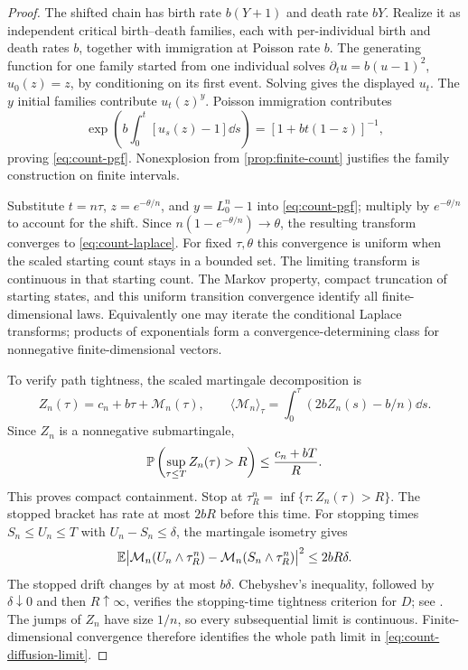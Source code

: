 \begin{proof}
The shifted chain has birth rate $b(Y+1)$ and death rate $bY$. Realize it
as independent critical birth--death families, each with per-individual
birth and death rates $b$, together with immigration at Poisson rate $b$.
The generating function for one family started from one individual solves
$\partial_tu=b(u-1)^2$, $u_0(z)=z$, by conditioning on its first event.
Solving gives the displayed $u_t$. The $y$ initial families contribute
$u_t(z)^y$. Poisson immigration contributes
\[
 \exp\left(b\int_0^t[u_s(z)-1]\dd s\right)
 =[1+bt(1-z)]^{-1},
\]
proving \eqref{eq:count-pgf}. Nonexplosion from \cref{prop:finite-count}
justifies the family construction on finite intervals.

Substitute $t=n\tau$, $z=e^{-\theta/n}$, and $y=L_0^n-1$ into
\eqref{eq:count-pgf}; multiply by $e^{-\theta/n}$ to account for the shift.
Since $n(1-e^{-\theta/n})\to\theta$, the resulting transform converges
to \eqref{eq:count-laplace}. For fixed $\tau,\theta$ this convergence is
uniform when the scaled starting count stays in a bounded set. The limiting
transform is continuous in that starting count. The Markov property,
compact truncation of starting states, and this uniform transition
convergence identify all finite-dimensional laws. Equivalently one may
iterate the conditional Laplace transforms; products of exponentials form
a convergence-determining class for nonnegative finite-dimensional vectors.

To verify path tightness, the scaled martingale decomposition is
\begin{equation}
 Z_n(\tau)=c_n+b\tau+\mathcal M_n(\tau),\qquad
 \langle\mathcal M_n\rangle_\tau
 =\int_0^\tau(2bZ_n(s)-b/n)\dd s.
 \label{eq:scaled-count-martingale}
\end{equation}
Since $Z_n$ is a nonnegative submartingale,
\[
 \mathbb P\left(\sup_{\tau\leq T}Z_n(\tau)>R\right)
 \leq\frac{c_n+bT}{R}.
\]
This proves compact containment. Stop at
$\tau_R^n=\inf\{\tau:Z_n(\tau)>R\}$. The stopped bracket has rate at
most $2bR$ before this time. For stopping times $S_n\leq U_n\leq T$
with $U_n-S_n\leq\delta$, the martingale isometry gives
\[
 \mathbb E\bigl|\mathcal M_n(U_n\wedge\tau_R^n)
          -\mathcal M_n(S_n\wedge\tau_R^n)\bigr|^2
 \leq2bR\delta.
\]
The stopped drift changes by at most $b\delta$. Chebyshev's inequality,
followed by $\delta\downarrow0$ and then $R\uparrow\infty$, verifies the
stopping-time tightness criterion for $D$; see
\citet[Section 16]{Billingsley1999}. The jumps of $Z_n$ have size $1/n$,
so every subsequential limit is continuous. Finite-dimensional convergence
therefore identifies the whole path limit in \eqref{eq:count-diffusion-limit}.


\end{proof}
